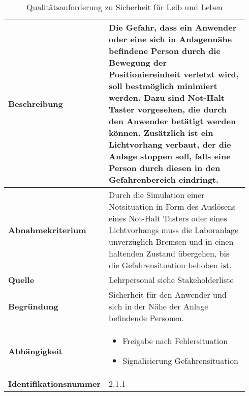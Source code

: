 \documentclass[../../../Bachelorarbeit.tex]{subfiles}
\begin{document}
\begin{table}[H]
    \centering
    \begin{tabular}{| p{0.34\linewidth} | p{0.6\linewidth} |}
        \hline
        \textbf{Beschreibung} & Die Gefahr, dass ein Anwender oder eine sich in Anlagennähe befindene Person durch die Bewegung der Positioniereinheit verletzt wird, soll bestmöglich minimiert werden. Dazu sind Not-Halt Taster vorgesehen, die durch den Anwender betätigt werden können. Zusätzlich ist ein Lichtvorhang verbaut, der die Anlage stoppen soll, falls eine Person durch diesen in den Gefahrenbereich eindringt. \\ \hline
        \textbf{Abnahmekriterium} & Durch die Simulation einer Notsituation in Form des Auslösens eines Not-Halt Tasters oder eines Lichtvorhangs muss die Laboranlage unverzüglich Bremsen und in einen haltenden Zustand übergehen, bis die Gefahrensituation behoben ist. \\ \hline
        \textbf{Quelle} & Lehrpersonal siehe Stakeholderliste \\ \hline
        \textbf{Begründung} & Sicherheit für den Anwender und sich in der Nähe der Anlage befindende Personen. \\ \hline
        \textbf{Abhängigkeit} & {\begin{itemize}[noitemsep,topsep=0pt,parsep=0pt,partopsep=0pt,leftmargin=*]
                                    \item Freigabe nach Fehlersituation
                                    \item Signalisierung Gefahrensituation
                                \end{itemize}} \\ \hline
        \textbf{Identifikationsnummer} & 2.1.1 \\ \hline
    \end{tabular}
    \caption[\acs{nfa} - Sicherheit für Leib und Leben]{Qualitätsanforderung zu Sicherheit für Leib und Leben}
    \label{tab:my-table11}
\end{table}
\end{document}
